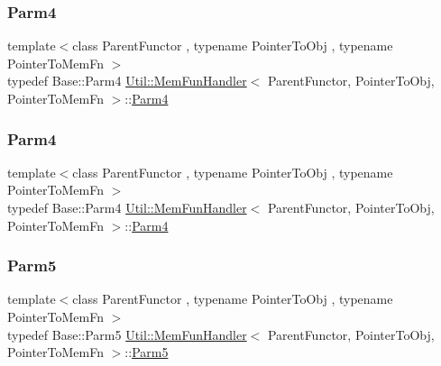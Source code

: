 \subsubsection{\texorpdfstring{Parm4}{Parm4}\hspace{0.1cm}{\footnotesize\ttfamily [1/2]}}
{\footnotesize\ttfamily template$<$class Parent\+Functor , typename Pointer\+To\+Obj , typename Pointer\+To\+Mem\+Fn $>$ \\
typedef Base\+::\+Parm4 \mbox{\hyperlink{classUtil_1_1MemFunHandler}{Util\+::\+Mem\+Fun\+Handler}}$<$ Parent\+Functor, Pointer\+To\+Obj, Pointer\+To\+Mem\+Fn $>$\+::\mbox{\hyperlink{classUtil_1_1MemFunHandler_a1e5a0cf582f3b540e409d333ae06a4bd}{Parm4}}}

\mbox{\label{classUtil_1_1MemFunHandler_a1e5a0cf582f3b540e409d333ae06a4bd}} 
\subsubsection{\texorpdfstring{Parm4}{Parm4}\hspace{0.1cm}{\footnotesize\ttfamily [2/2]}}
{\footnotesize\ttfamily template$<$class Parent\+Functor , typename Pointer\+To\+Obj , typename Pointer\+To\+Mem\+Fn $>$ \\
typedef Base\+::\+Parm4 \mbox{\hyperlink{classUtil_1_1MemFunHandler}{Util\+::\+Mem\+Fun\+Handler}}$<$ Parent\+Functor, Pointer\+To\+Obj, Pointer\+To\+Mem\+Fn $>$\+::\mbox{\hyperlink{classUtil_1_1MemFunHandler_a1e5a0cf582f3b540e409d333ae06a4bd}{Parm4}}}

\mbox{\label{classUtil_1_1MemFunHandler_a70d588c17500255eb899788aa0e6c29d}} 
\subsubsection{\texorpdfstring{Parm5}{Parm5}\hspace{0.1cm}{\footnotesize\ttfamily [1/2]}}
{\footnotesize\ttfamily template$<$class Parent\+Functor , typename Pointer\+To\+Obj , typename Pointer\+To\+Mem\+Fn $>$ \\
typedef Base\+::\+Parm5 \mbox{\hyperlink{classUtil_1_1MemFunHandler}{Util\+::\+Mem\+Fun\+Handler}}$<$ Parent\+Functor, Pointer\+To\+Obj, Pointer\+To\+Mem\+Fn $>$\+::\mbox{\hyperlink{classUtil_1_1MemFunHandler_a70d588c17500255eb899788aa0e6c29d}{Parm5}}}

